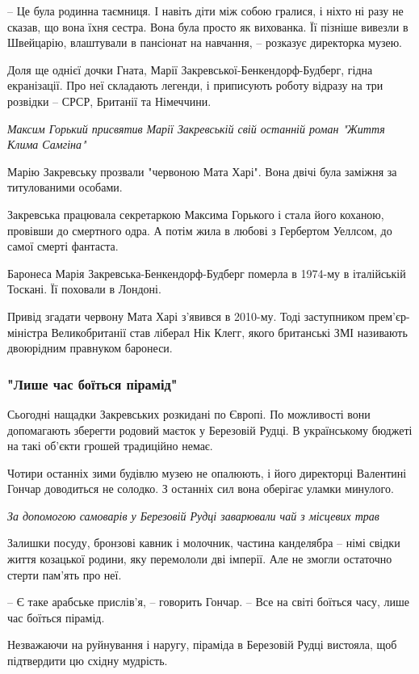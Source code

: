 – Це була родинна таємниця. І навіть діти між собою гралися, і ніхто ні разу не
сказав, що вона їхня сестра. Вона була просто як вихованка. Її пізніше вивезли
в Швейцарію, влаштували в пансіонат на навчання, – розказує директорка музею.

Доля ще однієї дочки Гната, Марії Закревської-Бенкендорф-Будберг, гідна
екранізації. Про неї складають легенди, і приписують роботу відразу на три
розвідки – СРСР, Британії та Німеччини.

\emph{Максим Горький присвятив Марії Закревській свій останній роман "Життя Клима Самгіна"}

Марію Закревську прозвали "червоною Мата Харі". Вона двічі була заміжня за титулованими особами.

Закревська працювала секретаркою Максима Горького і стала його коханою,
провівши до смертного одра. А потім жила в любові з Гербертом Уеллсом, до самої
смерті фантаста.

Баронеса Марія Закревська-Бенкендорф-Будберг померла в 1974-му в італійській
Тоскані. Її поховали в Лондоні.

Привід згадати червону Мата Харі з'явився в 2010-му. Тоді заступником
прем'єр-міністра Великобританії став ліберал Нік Клегг, якого британські ЗМІ
називають двоюрідним правнуком баронеси.

\subsubsection{"Лише час боїться пірамід"}

Сьогодні нащадки Закревських розкидані по Європі. По можливості вони
допомагають зберегти родовий маєток у Березовій Рудці. В українському бюджеті
на такі об'єкти грошей традиційно немає.

Чотири останніх зими будівлю музею не опалюють, і його директорці Валентині
Гончар доводиться не солодко. З останніх сил вона оберігає уламки минулого.

\emph{За допомогою самоварів у Березовій Рудці заварювали чай з місцевих трав}

Залишки посуду, бронзові кавник і молочник, частина канделябра – німі свідки життя козацької родини, яку перемололи дві імперії. Але не змогли остаточно стерти пам'ять про неї.

– Є таке арабське прислів’я, – говорить Гончар. – Все на світі боїться часу, лише час боїться пірамід.

Незважаючи на руйнування і наругу, піраміда в Березовій Рудці вистояла, щоб підтвердити цю східну мудрість.

